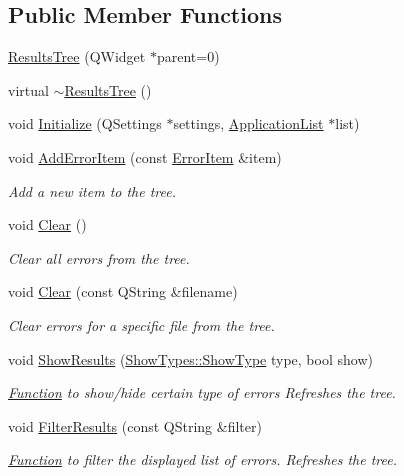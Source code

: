 \subsection*{Public Member Functions}
\begin{DoxyCompactItemize}
\item 
\hyperlink{class_results_tree_a3fbce5bb5c458ec496890af1f59af559}{Results\-Tree} (Q\-Widget $\ast$parent=0)
\item 
virtual \hyperlink{class_results_tree_a96a57550fe1ef45c3003ff830caf753b}{$\sim$\-Results\-Tree} ()
\item 
void \hyperlink{class_results_tree_a2afab0b7a2569de86167ad1b47992701}{Initialize} (Q\-Settings $\ast$settings, \hyperlink{class_application_list}{Application\-List} $\ast$list)
\item 
void \hyperlink{class_results_tree_a7ec565ce55d01f4b8272c6d15780e5b0}{Add\-Error\-Item} (const \hyperlink{class_error_item}{Error\-Item} \&item)
\begin{DoxyCompactList}\small\item\em Add a new item to the tree. \end{DoxyCompactList}\item 
void \hyperlink{class_results_tree_a1c98b1189bf5891d0301c57f6b5325ca}{Clear} ()
\begin{DoxyCompactList}\small\item\em Clear all errors from the tree. \end{DoxyCompactList}\item 
void \hyperlink{class_results_tree_a72f91a578f17b348d5a53144cd64bd6e}{Clear} (const Q\-String \&filename)
\begin{DoxyCompactList}\small\item\em Clear errors for a specific file from the tree. \end{DoxyCompactList}\item 
void \hyperlink{class_results_tree_a6e0acf8011f034fdbf14429cc6e84f6c}{Show\-Results} (\hyperlink{class_show_types_a92c368f2a33741268265ac2d931eae3f}{Show\-Types\-::\-Show\-Type} type, bool show)
\begin{DoxyCompactList}\small\item\em \hyperlink{class_function}{Function} to show/hide certain type of errors Refreshes the tree. \end{DoxyCompactList}\item 
void \hyperlink{class_results_tree_a2384fb6041109f3a53a4867eac15b563}{Filter\-Results} (const Q\-String \&filter)
\begin{DoxyCompactList}\small\item\em \hyperlink{class_function}{Function} to filter the displayed list of errors. Refreshes the tree. \end{DoxyCompactList}\item 

\end{DoxyCompactItemize}

